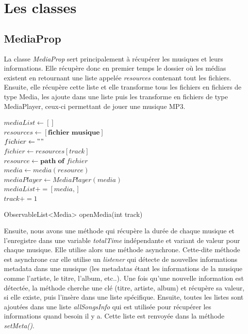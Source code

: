 \documentclass[a4paper,12pt]{report} %
\begin{document}
\newpage
\section{Les classes}

\subsection{MediaProp}

	La classe \textit{MediaProp} sert principalement à récupérer les musiques et leurs informations. Elle récupère donc en premier temps le dossier où les médias existent en retournant une liste appelée \textit{resources} contenant tout les fichiers. Ensuite, elle récupère cette liste et elle transforme tous les fichiers en fichiers de type Media, les ajoute dans une liste puis les transforme en fichiers de type MediaPlayer, ceux-ci permettant de jouer une musique MP3.
	
	\begin{algorithm}
		\DontPrintSemicolon %
		$mediaList \gets [ ]$\\
		$resources \gets [ \textbf{fichier musique} ]$\\
		$fichier \gets ""$\\
		 {
  			$fichier \gets resources[track]$\\
  			$resource \gets \textbf{path of } fichier$\\
  			$media \gets media(resource)$\\
  			$mediaPlayer \gets MediaPlayer(media)$\\
  			$mediaList+=[media,]$\\
  			$track+=1$
		}
		\;
		\caption{ObservableList<Media> openMedia(int track)}
	\end{algorithm}
	
	Ensuite, nous avons une méthode qui récupère la durée de chaque musique et l'enregistre dans une variable \textit{totalTime} indépendante et variant de valeur pour chaque musique. Elle utilise alors une méthode asynchrone. Cette-dite méthode est asynchrone car elle utilise un \textit{listener} qui détecte de nouvelles informations metadata dans une musique (les metadatas étant les informations de la musique comme l'artiste, le titre, l'album, etc..). Une fois qu'une nouvelle information est détectée, la méthode cherche une clé (titre, artiste, album) et récupère sa valeur, si elle existe, puis l'insère dans une liste spécifique. Ensuite, toutes les listes sont ajoutées dans une liste \textit{allSongsInfo} qui est utilisée pour récupérer les informations quand besoin il y a. Cette liste est renvoyée dans la méthode \textit{setMeta()}.\\	
	
\end{document}
